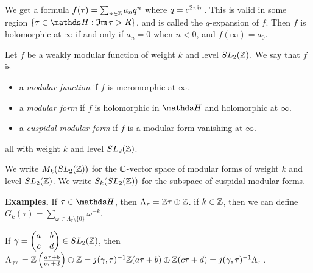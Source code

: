 \documentclass[10pt,a4paper]{article}
\begin{document}
We get a formula $f(\tau) = \sum_{n\in \mathbb{Z}}a_nq^n$ where $q = e^{2\pi\mathfrak{i}\tau}$. This is valid in some region $\{\tau \in \H : \Im \tau > R\}$, and is called the $q$-expansion of $f$. Then $f$ is holomorphic at $\infty$ if and only if $a_n = 0$ when $n < 0$, and $f(\infty) = a_0$.
\begin{definition}
  Let $f$ be a weakly modular function of weight $k$ and level $SL_2(\mathbb{Z})$. We say that $f$ is
  \begin{itemize}
    \item a \emph{modular function} if $f$ is meromorphic at $\infty$.
    \item a \emph{modular form} if $f$ is holomorphic in $\H$ and holomorphic at $\infty$.
    \item a \emph{cuspidal modular form} if $f$ is a modular form vanishing at $\infty$.
  \end{itemize}
  all with weight $k$ and level $SL_2(\mathbb{Z})$.

  We write $M_k(SL_2(\mathbb{Z}))$ for the $\mathbb{C}$-vector space of modular forms of weight $k$ and level $SL_2(\mathbb{Z})$. We write $S_k(SL_2(\mathbb{Z}))$ for the subspace of cuspidal modular forms.
\end{definition}
\textbf{Examples.} If $\tau \in \H$, then $\Lambda_\tau = \mathbb{Z}\tau \oplus \mathbb{Z}$. if $k \in \mathbb{Z}$, then we can define $G_k(\tau) = \sum\limits_{\omega \in \Lambda_\tau\setminus\{0\}}\omega^{-k}$.

If $\gamma = \begin{pmatrix}a&b\\c&d\end{pmatrix} \in SL_2(\mathbb{Z})$, then $\Lambda_{\gamma \tau} = \mathbb{Z}\left(\frac{a\tau+b}{c\tau+d}\right)\oplus \mathbb{Z} = j(\gamma,\tau)^{-1}\mathbb{Z}(a\tau+b)\oplus \mathbb{Z}(c\tau+d) = j(\gamma,\tau)^{-1}\Lambda_\tau$.
\end{document}
